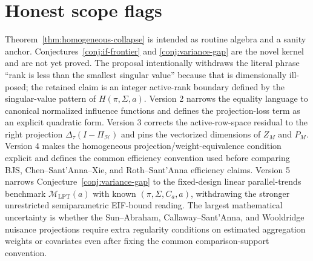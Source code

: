 \documentclass[11pt]{article}
\newcommand{\calH}{\mathcal{H}}
\theoremstyle{definition}
\theoremstyle{plain}
\theoremstyle{remark}
\begin{document}
\section{Honest scope flags}
Theorem~\ref{thm:homogeneous-collapse} is intended as routine algebra and a
sanity anchor.  Conjectures~\ref{conj:if-frontier} and
\ref{conj:variance-gap} are the novel kernel and are not yet proved.  The
proposal intentionally withdraws the literal phrase ``rank is less than the
smallest singular value'' because that is dimensionally ill-posed; the retained
claim is an integer active-rank boundary defined by the singular-value pattern
of \(H(\pi,\Sigma,a)\).  Version 2 narrows the equality language to canonical
normalized influence functions and defines the projection-loss term as an
explicit quadratic form.  Version 3 corrects the active-row-space residual to
the right projection \(\Delta_\tau(I-\Pi_{\calH})\) and pins the vectorized
dimensions of \(Z_M\) and \(P_M\).  Version 4 makes the homogeneous
projection/weight-equivalence condition explicit and defines the common
efficiency convention used before comparing BJS, Chen--Sant'Anna--Xie, and
Roth--Sant'Anna efficiency claims.  Version 5 narrows
Conjecture~\ref{conj:variance-gap} to the fixed-design linear parallel-trends
benchmark \(\mathcal M_{\mathrm{LPT}}(a)\) with known
\((\pi,\Sigma,C_a,a)\), withdrawing the stronger unrestricted semiparametric
EIF-bound reading.  The largest mathematical uncertainty is whether the
Sun--Abraham, Callaway--Sant'Anna, and Wooldridge nuisance projections require
extra regularity conditions on estimated aggregation weights or covariates even
after fixing the common comparison-support convention.
\end{document}
